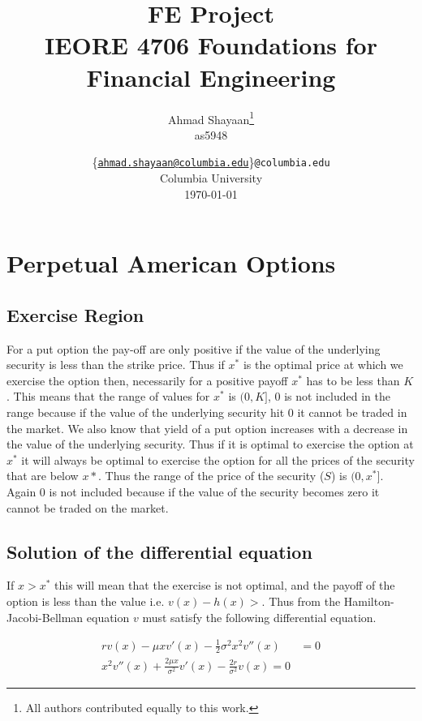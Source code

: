 \documentclass[12pt]{report}
\title{\Large{\textbf{FE Project}}\\\Large{IEORE 4706 Foundations for Financial Engineering}}
\author{
    Ahmad Shayaan\thanks{All authors contributed equally to this work.} \\as5948
    }
\date{
\{\href{mailto:ahmad.shayaan@columbia.edu}{\texttt{\small{ahmad.shayaan@columbia.edu}}}\}\texttt{\small{@columbia.edu}}\\
    Columbia University\\
    \today}
\begin{document}
\maketitle
\tableofcontents

\pagebreak

\chapter*{Perpetual American Options}

\section*{Exercise Region}
For a put option the pay-off are only positive if the value of the underlying security is less than the strike price. Thus if $x^*$ is the optimal price at which we exercise the option then, necessarily for a positive payoff $x^*$ has to be less than $K$. This means that the range of values for $x^*$ is $(0,K]$, 0 is not included in the range because if the value of the underlying security hit 0 it cannot be traded in the market. We also know that yield of a put option increases with a decrease in the value of the underlying security. Thus if it is optimal to exercise the option at $x^*$ it will always be optimal to exercise the option for all the prices of the security that are below $x*$. Thus the range of the price of the security ($S$) is $(0,x^*]$. Again 0 is not included because if the value of the security becomes zero it cannot be traded on the market.

\section*{Solution of the differential equation}
If $x > x^*$ this will mean that the exercise is not optimal, and the payoff of the option is less than the value i.e. $v(x) - h(x) > $. Thus from the Hamilton-Jacobi-Bellman equation $v$ must satisfy the following differential equation.

\begin{equation*}
	\begin{aligned}
		rv(x) -\mu xv'(x) - \frac{1}{2} \sigma^2 x^2 v''(x) &= 0 \\
		x^2v''(x) + \frac{2\mu x}{\sigma^2}v'(x) - \frac{2r}{\sigma^2} v(x) = 0
	\end{aligned}
\end{equation*}
\end{document}
